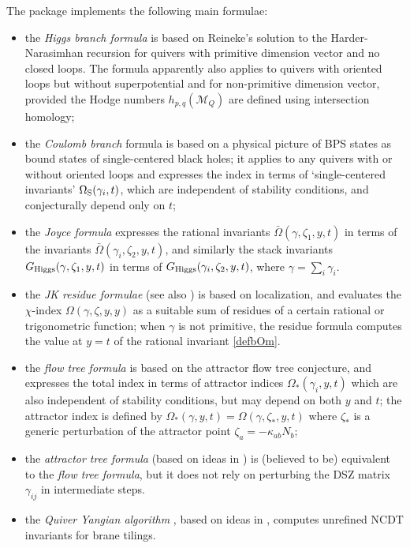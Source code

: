 \documentclass[12pt]{JHEP3}
\newcommand\bOm{\bar\Omega}
\newcommand{\cM}{\mathcal{M}}
\newcommand{\gR}{G_{\rm Higgs}}
\newcommand{\OmS}{\Omega_{\rm S}}
\newcommand{\Omatt}{\Omega_*}
\begin{document}
\medskip

The package implements the following main formulae:
 \begin{itemize}
 
 \item  the {\it Higgs branch formula} is  based on Reineke's solution to the Harder-Narasimhan recursion \cite{1043.17010} for quivers with primitive dimension vector and no closed loops. 
 The formula apparently also applies to quivers with oriented loops but without superpotential 
 and for non-primitive dimension vector, provided the Hodge numbers $h_{p,q}(\cM_Q)$
 are defined using intersection homology;
 
 \item the {\it Coulomb branch} formula \cite{Manschot:2010qz,Manschot:2011xc,
 Manschot:2012rx,Manschot:2014fua} is based on a physical picture of BPS states as bound states of single-centered black holes; it applies to any quivers with or without oriented loops  and expresses the index in terms
 of `single-centered invariants' $\OmS(\gamma_i,t)$, which are independent of stability conditions,
 and conjecturally depend only on $t$;
 
 \item the {\it Joyce formula}  \cite{joyce2008configurations} expresses the rational invariants $\bOm(\gamma,\zeta_1,y,t)$ in terms of the invariants $\bOm(\gamma_i,\zeta_2,y,t)$, and
 similarly the stack invariants $\gR(\gamma,\zeta_1,y,t)$ in terms of $\gR(\gamma_i,\zeta_2,y,t)$,
 where $\gamma=\sum_i \gamma_i$.

\item the  {\it JK residue formulae} \cite{Hori:2014tda} (see also \cite{Cordova:2014oxa,Benini:2013xpa}) is based on localization, and evaluates the $\chi$-index
$\Omega(\gamma,\zeta,y,y)$ as a suitable sum of residues of a certain rational or trigonometric function; when $\gamma$ is not primitive, the residue formula computes the value at $y=t$ of the rational invariant
\eqref{defbOm}.

\item the  {\it flow tree formula} \cite{Alexandrov:2018iao} is based on 
 the attractor flow tree conjecture, and expresses the total index in terms of attractor indices
 $\Omatt(\gamma_i,y,t)$ which are also independent of stability conditions, but may depend on both 
 $y$ and $t$; the attractor index is defined by  $\Omatt(\gamma,y,t)=\Omega(\gamma,\zeta_*,y,t)$ 
 where $\zeta_*$ is 
 a generic perturbation of the attractor point $\zeta_a=-\kappa_{ab} N_b$;  

\item the {\it attractor tree formula} \cite{BPMozgovoy} (based on ideas in \cite{Alexandrov:2019rth})
is (believed to be) equivalent
to the  {\it flow tree formula}, but it does not rely on perturbing the DSZ matrix $\gamma_{ij}$
in intermediate steps.


\item the {\it Quiver Yangian algorithm} \cite{BPinprogress}, based on ideas in \cite{Li:2020rij},  computes unrefined NCDT invariants for brane tilings.  

\end{itemize}
\end{document}
